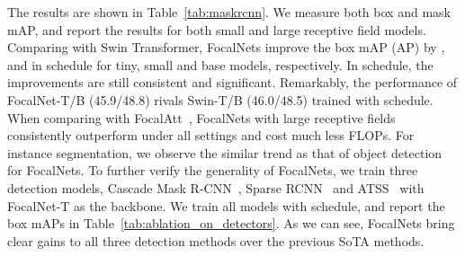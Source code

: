 \documentclass{article}
\begin{document}
The results are shown in Table~\ref{tab:maskrcnn}. We measure both box and mask mAP, and report the results for both small and large receptive field models. Comparing with Swin Transformer, FocalNets improve the box mAP (AP) by ,  and  in  schedule for tiny, small and base models, respectively. In  schedule, the improvements are still consistent and significant. Remarkably, the  performance of FocalNet-T/B (45.9/48.8) rivals Swin-T/B (46.0/48.5) trained with  schedule. When comparing with FocalAtt~\cite{yang2021focal}, FocalNets with large receptive fields consistently outperform under all settings and cost much less FLOPs. For instance segmentation, we observe the similar trend as that of object detection for FocalNets.
To further verify the generality of FocalNets, we train three detection models, Cascade Mask R-CNN~\cite{cai2018cascade}, Sparse RCNN~\cite{sun2020sparse} and  ATSS~\cite{zhang2020bridging} with FocalNet-T as the backbone. We train all models with  schedule, and report the box mAPs in Table~\ref{tab:ablation_on_detectors}. As we can see, FocalNets bring clear gains to all three detection methods over the previous SoTA methods.
\end{document}
